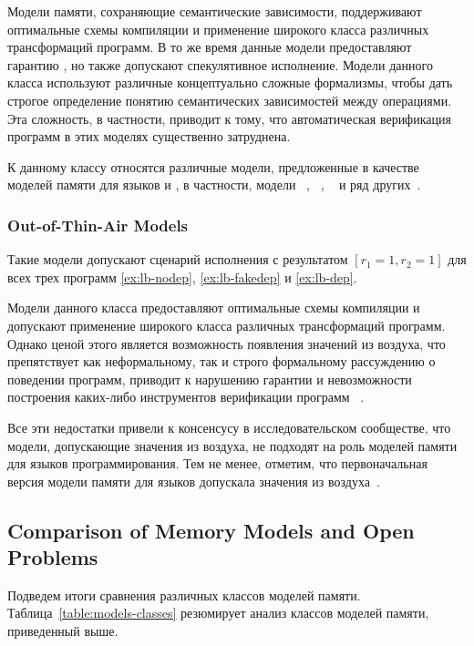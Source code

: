 Модели памяти, сохраняющие семантические зависимости,
поддерживают оптимальные схемы компиляции и
применение широкого класса различных трансформаций программ.
В то же время данные модели предоставляют гарантию \DRF,
но также допускают спекулятивное исполнение.
Модели данного класса используют различные
концептуально сложные формализмы, чтобы дать строгое определение
понятию семантических зависимостей между операциями.
Эта сложность, в частности, приводит к тому,
что автоматическая верификация программ в этих моделях существенно затруднена.

К данному классу относятся различные модели,
предложенные в качестве моделей памяти для
языков \CPP и \Java, в частности, модели
\Prm~\cite{Kang-al:POPL17},
\Wkm~\cite{Chakraborty-Vafeiadis:POPL19}, 
\PwP~\cite{Jagadeesan-al:OOPSLA2020}
и ряд других~\cite{Jeffrey-Riely:LICS16,PichonPharabod-Sewell:POPL16,Paviotti-al:ESOP20}.

\subsubsection*{Out-of-Thin-Air Models}

Такие модели допускают сценарий исполнения с результатом ${[r_1=1,r_2=1]}$
для всех трех программ \ref{ex:lb-nodep}, \ref{ex:lb-fakedep} и \ref{ex:lb-dep}.

Модели данного класса предоставляют оптимальные схемы компиляции и
допускают применение широкого класса различных трансформаций программ.
Однако ценой этого является возможность появления значений из воздуха, что препятствует как неформальному,
так и строго формальному рассуждению о поведении программ,
приводит к нарушению гарантии \DRF и невозможности
построения каких-либо инструментов верификации программ%
~\cite{Boehm-Demsky:MSPC14, Batty-al:ESOP15}. 

Все эти недостатки 
привели к консенсусу в исследовательском сообществе,
что модели, допускающие значения из воздуха,
не подходят на роль моделей памяти 
для языков программирования.
Тем не менее, отметим, что первоначальная версия модели памяти для языков \CPP
допускала значения из воздуха~\cite{Batty-al:POPL11}.

\subsection{Comparison of Memory Models and Open Problems}
\label{sec:models-summary}

Подведем итоги сравнения различных классов моделей памяти. 
Таблица~\ref{table:models-classes} резюмирует 
анализ классов моделей памяти, приведенный выше.

